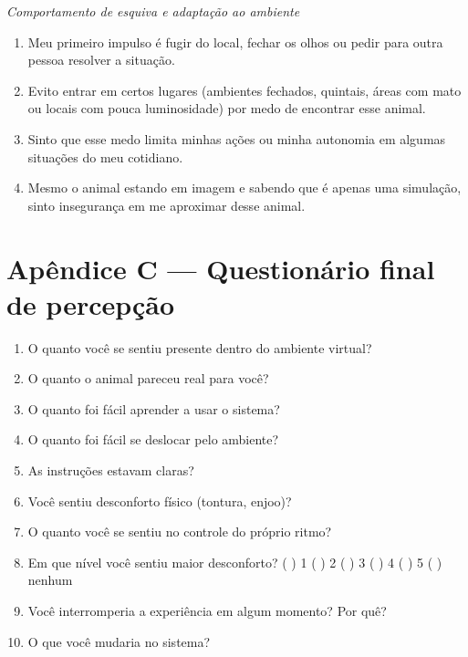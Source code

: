 \noindent\emph{Comportamento de esquiva e adaptação ao ambiente}
\begin{enumerate}
  \item Meu primeiro impulso é fugir do local, fechar os olhos ou pedir para
  outra pessoa resolver a situação.
  \item Evito entrar em certos lugares (ambientes fechados, quintais, áreas com
  mato ou locais com pouca luminosidade) por medo de encontrar esse animal.
  \item Sinto que esse medo limita minhas ações ou minha autonomia em algumas
  situações do meu cotidiano.
  \item Mesmo o animal estando em imagem e sabendo que é apenas uma simulação,
  sinto insegurança em me aproximar desse animal.
\end{enumerate}

\endgroup

\newpage
\section*{Apêndice C --- Questionário final de percepção}


\begin{enumerate}
  \item O quanto você se sentiu presente dentro do ambiente virtual?
  \item O quanto o animal pareceu real para você?
  \item O quanto foi fácil aprender a usar o sistema?
  \item O quanto foi fácil se deslocar pelo ambiente?
  \item As instruções estavam claras?
  \item Você sentiu desconforto físico (tontura, enjoo)?
  \item O quanto você se sentiu no controle do próprio ritmo?
  \item Em que nível você sentiu maior desconforto? ( ) 1 ( ) 2 ( ) 3 ( ) 4 ( ) 5 ( ) nenhum
  \item Você interromperia a experiência em algum momento? Por quê?
  \item O que você mudaria no sistema?
\end{enumerate}
